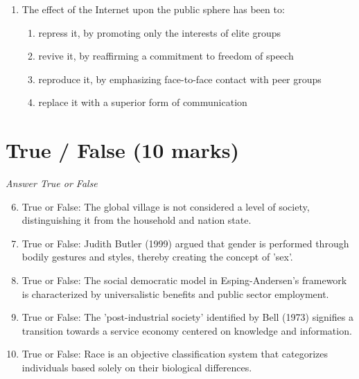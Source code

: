 \documentclass[12pt]{article}
\begin{document}
\begin{enumerate}[label=\arabic*.]
\begin{enumerate}[label=(\alph*)]
    \item private, public and comprehensive schools
    \item grammar, technical, and secondary modern schools
    \item polytechnics, colleges and universities
\end{enumerate}
\item The effect of the Internet upon the public sphere has been to:
\begin{enumerate}[label=(\alph*)]
    \item repress it, by promoting only the interests of elite groups
    \item revive it, by reaffirming a commitment to freedom of speech
    \item reproduce it, by emphasizing face-to-face contact with peer groups
    \item replace it with a superior form of communication
\end{enumerate}
\end{enumerate}

\section*{True / False (10 marks)}
\textit{Answer True or False}
\begin{enumerate}[label=\arabic*.]
\setcounter{enumi}{5}
\item True or False: The global village is not considered a level of society, distinguishing it from the household and nation state.
\item True or False: Judith Butler (1999) argued that gender is performed through bodily gestures and styles, thereby creating the concept of 'sex'.
\item True or False: The social democratic model in Esping-Andersen's framework is characterized by universalistic benefits and public sector employment.
\item True or False: The 'post-industrial society' identified by Bell (1973) signifies a transition towards a service economy centered on knowledge and information.
\item True or False: Race is an objective classification system that categorizes individuals based solely on their biological differences.
\end{enumerate}
\end{document}
